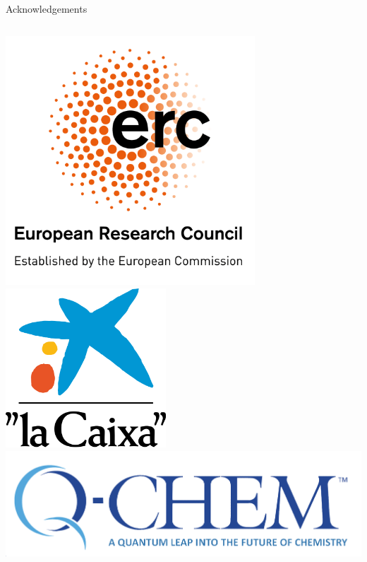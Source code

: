 \documentclass[9pt,t,xcolor=table]{beamer}
\begin{document}
\begin{frame}{\huge Acknowledgements}
\begin{columns}
\begin{column}[c]{0.3\textwidth}
			\includegraphics[width=0.7\textwidth]{Figs/erc.png}\\\vfill
			\includegraphics[width=0.45\textwidth]{Figs/La-Caixa.png}\\\vfill
			\includegraphics[width=\textwidth]{Figs/QCLogo.png}\\\vfill
		\end{column}
	\end{columns}

	\vspace{3pt}
\end{frame}
\end{document}
